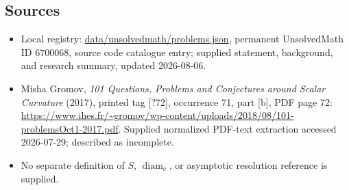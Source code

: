 \documentclass[11pt]{article}
\begin{document}
\subsection{Sources}
\begin{itemize}
\item Local registry: \url{data/unsolvedmath/problems.json}, permanent UnsolvedMath ID \(6700068\), source code catalogue entry; supplied statement, background, and research summary, updated 2026-08-06.
\item Misha Gromov, \emph{101 Questions, Problems and Conjectures around Scalar Curvature} (2017), printed tag [?72], occurrence 71, part [b], PDF page 72: \url{https://www.ihes.fr/~gromov/wp-content/uploads/2018/08/101-problemsOct1-2017.pdf}. Supplied normalized PDF-text extraction accessed 2026-07-29; described as incomplete.
\item No separate definition of \(S\), \(\operatorname{diam}_c\), or asymptotic resolution reference is supplied.
\end{itemize}
\end{document}
